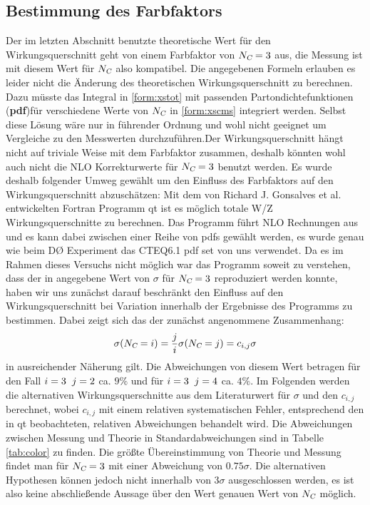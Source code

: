 \documentclass[a4paper,12pt]{article}
\begin{document}
\subsection{Bestimmung des Farbfaktors}
Der im letzten Abschnitt benutzte theoretische Wert für den Wirkungsquerschnitt geht von einem Farbfaktor von $N_{\textsl{C}}=3$ aus, die
Messung ist mit diesem Wert für $N_{\textsl{C}}$ also kompatibel. Die angegebenen Formeln erlauben es leider nicht die Änderung des theoretischen
Wirkungsquerschnitt zu berechnen. Dazu müsste das Integral in \ref{form:xstot} mit passenden  Partondichtefunktionen (\textbf{pdf})für verschiedene Werte
von $N_{\textsl{C}}$ in \ref{form:xscms} integriert werden. Selbst diese Lösung wäre nur in führender Ordnung und wohl nicht geeignet um Vergleiche
zu den Messwerten durchzuführen.Der Wirkungsquerschnitt hängt nicht auf triviale Weise mit dem Farbfaktor zusammen, deshalb könnten wohl auch nicht die
NLO Korrekturwerte für $N_{\textsl{C}}=3$ benutzt werden. Es wurde deshalb folgender Umweg gewählt um den Einfluss des Farbfaktors auf den
Wirkungsquerschnitt abzuschätzen:
Mit dem von Richard J. Gonsalves et al. entwickelten Fortran Programm qt \cite{qtsite} ist es möglich totale W/Z  Wirkungsquerschnitte
zu berechnen. Das Programm führt NLO Rechnungen aus und es kann dabei zwischen einer Reihe von pdfs gewählt werden, es wurde genau wie beim
DØ Experiment \cite{Abachi:1996ey} das CTEQ6.1 pdf set von uns verwendet. Da es im Rahmen dieses Versuchs nicht möglich war das Programm
soweit zu verstehen, dass der in \cite{versuchsanleitung} angegebene Wert von $\sigma$ für $N_{\textsl{C}}=3$ reproduziert werden konnte, haben
wir uns zunächst darauf beschränkt den Einfluss auf den Wirkungsquerschnitt bei Variation innerhalb der Ergebnisse des Programms zu bestimmen.
Dabei zeigt sich das der zunächst angenommene Zusammenhang:
\begin{align*}
	\sigma (N_{\textsl{C}}= i) = \frac{j}{i} \sigma (N_{\textsl{C}}= j) = c_{i,j} \sigma
\end{align*}
in ausreichender Näherung gilt. Die Abweichungen von diesem Wert betragen für den Fall $i=3 \hspace{0.2cm} j=2$ ca. $9\% $ und für $i=3 \hspace{0.2cm} j=4$
ca. $4\% $. Im Folgenden werden die alternativen Wirkungsquerschnitte aus dem Literaturwert für $\sigma $ und den $c_{i,j}$ berechnet,
wobei $c_{i,j}$ mit einem relativen systematischen Fehler, entsprechend den in qt beobachteten, relativen Abweichungen behandelt wird.
Die Abweichungen zwischen Messung und Theorie in Standardabweichungen sind in Tabelle \ref{tab:color} zu finden. Die größte Übereinstimmung
von Theorie und Messung findet man für $N_{\textsl{C}}= 3$ mit einer Abweichung von $0.75\sigma$. Die alternativen Hypothesen können jedoch
nicht innerhalb von $3\sigma$ ausgeschlossen werden, es ist also keine abschließende Aussage über den Wert genauen Wert von $N_{\textsl{C}}$ möglich.
\end{document}

